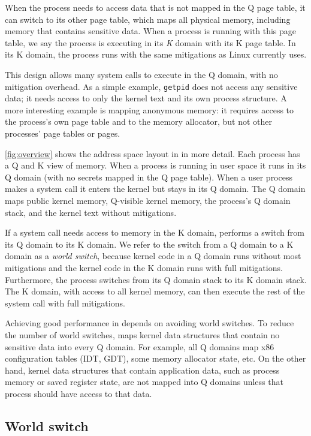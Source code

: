 When the process needs to access data that is not mapped in the Q page
table, it can switch to its other page table, which maps all physical
memory, including memory that contains sensitive data.  When a process
is running with this page table, we say the process is executing in
its \textit{K} domain with its K page table.  In its K domain, the process
runs with the same mitigations as Linux currently uses.

This design allows many system calls to execute in the Q domain,
with no mitigation overhead.  As a simple example,
\texttt{getpid} does not access any sensitive data; it needs
access to only the kernel text and its own process structure.  A more
interesting example is mapping anonymous memory: it requires access
to the process's own page table and to the memory allocator, but not
other processes' page tables or pages.

\autoref{fig:overview} shows the address space layout in \sys in more
detail.  Each process has a Q and K view of memory.  When a process is
running in user space it runs in its Q domain (with no secrets mapped
in the Q page table).  When a user process makes a system call it
enters the kernel but stays in its Q domain.  The Q domain maps public
kernel memory, Q-visible kernel memory, the process's Q domain stack,
and the kernel text without mitigations.

If a system call needs access to memory in the K domain, \sys performs a
switch from its Q domain to its K domain. We refer to the switch from a Q
domain to a K domain as a \textit{world switch}, because kernel code in
a Q domain runs without most mitigations and the kernel code in the K domain
runs with full mitigations. Furthermore, the process switches from its
Q domain stack to its K domain stack.  The K domain, with access to
all kernel memory, can then execute the rest of the system call with
full mitigations.

Achieving good performance in \sys depends on avoiding world switches.
To reduce the number of world switches, \sys maps kernel data
structures that contain no sensitive data into every Q domain.  For
example, all Q domains map x86 configuration tables (IDT, GDT), some
memory allocator state, etc.  On the other hand, kernel data structures
that contain application data, such as process memory or saved register
state, are not mapped into Q domains unless that process should have
access to that data.

\subsection{World switch}
\label{ss:switch}

